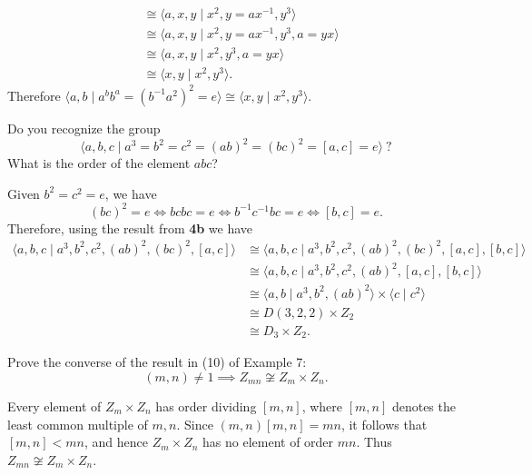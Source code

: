 \begin{questions}
\begin{solution}
\begin{align*}
                                                          &\cong \langle a,x,y \mid x^2, y=ax^{-1}, y^3 \rangle \\
                                                          &\cong \langle a,x,y \mid x^2, y=ax^{-1}, y^3, a=yx \rangle \\
                                                          &\cong \langle a,x,y \mid x^2, y^3, a=yx \rangle \\
                                                          &\cong \langle x,y \mid x^2, y^3 \rangle.
    \end{align*}
    Therefore $\langle a,b \mid a^bb^a = (b^{-1}a^2)^2 = e \rangle\cong\langle x,y \mid x^2, y^3 \rangle$.
  \end{solution}

\question Do you recognize the group
  \[ \langle a,b,c \mid a^3=b^2=c^2=(ab)^2=(bc)^2=[a,c]=e \rangle\ ? \]
  What is the order of the element $abc$?
  \begin{solution}
    Given $b^2=c^2=e$, we have
    \[ (bc)^2 = e \iff bcbc = e \iff b^{-1}c^{-1}bc = e \iff [b,c]=e. \]
    Therefore, using the result from \textbf{4b} we have
    \begin{align*}
      \langle a,b,c \mid a^3, b^2, c^2, (ab)^2, (bc)^2, [a,c] \rangle &\cong \langle a,b,c \mid a^3, b^2, c^2, (ab)^2, (bc)^2, [a,c], [b,c] \rangle \\
                                                                      &\cong \langle a,b,c \mid a^3, b^2, c^2, (ab)^2, [a,c], [b,c] \rangle \\
                                                                      &\cong \langle a,b \mid a^3, b^2, (ab)^2 \rangle \times \langle c \mid c^2 \rangle \\
                                                                      &\cong D(3,2,2) \times Z_2 \\
                                                                      &\cong D_3 \times Z_2.
    \end{align*}
  \end{solution}

\question Prove the converse of the result in (10) of Example 7:
  \[ (m,n)\neq1 \implies Z_{mn} \not\cong Z_m\times Z_n. \]
  \begin{solution}
    Every element of $Z_m\times Z_n$ has order dividing $[m,n]$, where $[m,n]$ denotes the least common multiple of $m,n$. Since $(m,n)[m,n]=mn$, it follows that $[m,n]<mn$, and hence $Z_m\times Z_n$ has no element of order $mn$. Thus $Z_{mn}\not\cong Z_m\times Z_n$.
  \end{solution}


\end{questions}
